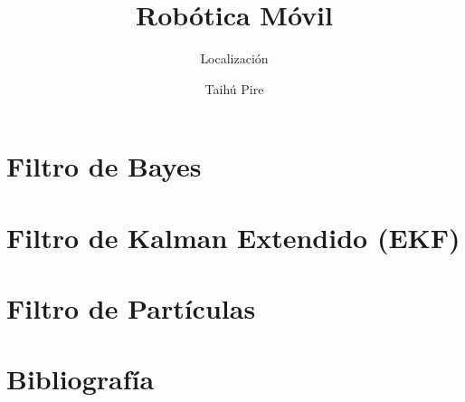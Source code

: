 \documentclass[aspectratio=169,compress]{beamer}
\subtitle{Localización}
\title{Robótica Móvil}
\author{Taihú Pire}
\institute{}
\date{}
\begin{document}
	
	\frame{\titlepage}
	
	\section{Filtro de Bayes}
	
	
	\section{Filtro de Kalman Extendido (EKF)}
	

   	\section{Filtro de Partículas}
    
	
	\section{Bibliografía}
	
	
	
\end{document}
